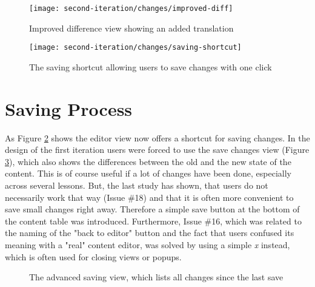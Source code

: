 \begin{figure}[h]
 \centering
 \texttt{[image: second-iteration/changes/improved-diff]}
 \caption{Improved difference view showing an added translation}
 \label{fig:improved-diff-view}
\end{figure}

\begin{figure}[h]
 \centering
 \texttt{[image: second-iteration/changes/saving-shortcut]}
 \caption{The saving shortcut allowing users to save changes with one click}
 \label{fig:saving-shortcut}
\end{figure}

\section{Saving Process}
As Figure \ref{fig:saving-shortcut} shows the editor view now offers a shortcut for saving changes. In the design of the first iteration users were forced to use the save changes view (Figure \ref{fig:save-changes}), which also shows the differences between the old and the new state of the content. This is of course useful if a lot of changes have been done, especially across several lessons. But, the last study has shown, that users do not necessarily work that way (Issue \#18) and that it is often more convenient to save small changes right away. Therefore a simple save button at the bottom of the content table was introduced. Furthermore, Issue \#16, which was related to the naming of the "back to editor" button and the fact that users confused its meaning with a "real" content editor, was solved by using a simple \emph{x} instead, which is often used for closing views or popups.

\begin{figure}[h!]
 \centering
 \caption{The advanced saving view, which lists all changes since the last save}
 \label{fig:save-changes}
\end{figure}

